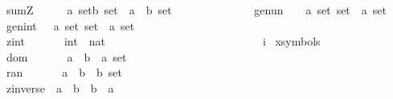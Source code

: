 \begin{isabellebody}
\ \ sumZ\ \ \ \ \ \ {\isacharcolon}{\isacharcolon}{\isachardoublequoteopen}{\isacharbrackleft}{\isacharprime}a\ set{\isacharcomma}{\isacharprime}b\ set{\isacharbrackright}\ {\isacharequal}{\isachargreater}\ {\isacharparenleft}{\isacharprime}a\ {\isacharplus}\ {\isacharprime}b{\isacharparenright}\ set{\isachardoublequoteclose}\ \ \ \ \ \ \ {\isacharparenleft}{\isachardoublequoteopen}{\isacharunderscore}\ {\isacharpercent}{\isacharplus}\ {\isacharunderscore}{\isachardoublequoteclose}\ \ {\isacharbrackleft}{}{}{\isacharcomma}{}{}{\isacharbrackright}\ {}{}{\isacharparenright}\isanewline
\ \ gen{\isacharunderscore}un\ \ \ \ {\isacharcolon}{\isacharcolon}{\isachardoublequoteopen}{\isacharprime}a\ set\ set\ {\isacharequal}{\isachargreater}\ {\isacharprime}a\ set{\isachardoublequoteclose}\ \isanewline
\ \ gen{\isacharunderscore}int\ \ \ {\isacharcolon}{\isacharcolon}{\isachardoublequoteopen}{\isacharprime}a\ set\ set\ {\isacharequal}{\isachargreater}\ {\isacharprime}a\ set{\isachardoublequoteclose}\isanewline
\ \ zint\ \ \ \ \ \ {\isacharcolon}{\isacharcolon}\ {\isachardoublequoteopen}int\ {\isacharequal}{\isachargreater}\ nat{\isachardoublequoteclose}\ \ \ \ \ \ \ \ \ \ \ \ \ \ \ \ \ \ \ \ \ \ \ \ \ \ \ \ {\isacharparenleft}{\isachardoublequoteopen}{\isachardollar}i{\isachardoublequoteclose}{\isacharparenright}\isanewline
\isanewline
{}\isamarkupfalse%
\ {\isacharparenleft}xsymbols{\isacharparenright}\isanewline
\ \ dom\ \ \ \ \ \ \ {\isacharcolon}{\isacharcolon}{\isachardoublequoteopen}{\isacharparenleft}{\isacharprime}a\ {\isacharless}{\isacharequal}{\isachargreater}\ {\isacharprime}b{\isacharparenright}\ {\isacharequal}{\isachargreater}\ {\isacharprime}a\ set{\isachardoublequoteclose}\ \ \ \ \ \ \ \ \ \ \ \ \ \ \ \ \ \ {\isacharparenleft}{\isachardoublequoteopen}{\isasymdom}{\isachardoublequoteclose}{\isacharparenright}\isanewline
\ \ ran\ \ \ \ \ \ \ {\isacharcolon}{\isacharcolon}{\isachardoublequoteopen}{\isacharparenleft}{\isacharprime}a\ {\isacharless}{\isacharequal}{\isachargreater}\ {\isacharprime}b{\isacharparenright}\ {\isacharequal}{\isachargreater}\ {\isacharprime}b\ set{\isachardoublequoteclose}\ \ \ \ \ \ \ \ \ \ \ \ \ \ \ \ \ \ {\isacharparenleft}{\isachardoublequoteopen}{\isasymran}{\isachardoublequoteclose}{\isacharparenright}\isanewline
\ \ zinverse\ \ {\isacharcolon}{\isacharcolon}{\isachardoublequoteopen}{\isacharparenleft}{\isacharprime}a\ {\isacharless}{\isacharequal}{\isachargreater}\ {\isacharprime}b{\isacharparenright}\ {\isacharequal}{\isachargreater}\ {\isacharparenleft}{\isacharprime}b\ {\isacharless}{\isacharequal}{\isachargreater}\ {\isacharprime}a{\isacharparenright}{\isachardoublequoteclose}\ \ \ \ \ \ \ \ \ \ \ \ \ {\isacharparenleft}{\isachardoublequoteopen}{\isacharunderscore}{\isasyminv}{\isachardoublequoteclose}\ \ \ \ {\isacharbrackleft}{}{}{}{}{\isacharbrackright}{}{}{}{\isacharparenright}\ \isanewline

\end{isabellebody}
